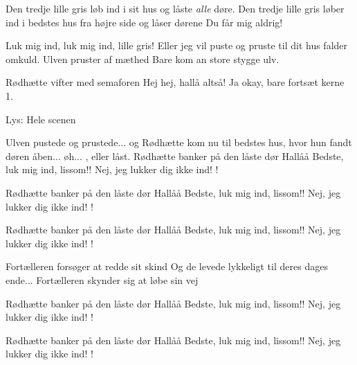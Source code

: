 \documentclass[a4paper,11pt]{article}
\begin{document}
\begin{sketch}
 Den tredje lille gris løb ind i sit hus og låste \emph{alle} døre.
\scene Den tredje lille gris løber ind i bedstes hus fra højre side og låser dørene
 Du får mig aldrig!

 Luk mig ind, luk mig ind, lille gris! Eller jeg vil  puste og pruste til dit hus falder omkuld.
\scene Ulven pruster af mæthed
 Bare kom an store stygge ulv.

\scene Rødhætte vifter med semaforen
 Hej hej, hallå altså!
 Ja okay, bare fortsæt kerne 1.

\scene Lys: Hele scenen

 Ulven pustede og prustede... og Rødhætte kom nu til bedstes hus, hvor hun fandt døren åben... øh... , eller låst.
\scene Rødhætte banker på den låste dør
 Hallåå Bedste, luk mig ind, lissom!!
 Nej, jeg lukker dig ikke ind!
  !

\scene Rødhætte banker på den låste dør
 Hallåå Bedste, luk mig ind, lissom!!
 Nej, jeg lukker dig ikke ind!
  !

\scene Rødhætte banker på den låste dør
 Hallåå Bedste, luk mig ind, lissom!!
 Nej, jeg lukker dig ikke ind!
  !

\scene Fortælleren forsøger at redde sit skind
 Og de levede lykkeligt til deres dages ende...
\scene Fortælleren skynder sig at løbe sin vej

\scene Rødhætte banker på den låste dør
 Hallåå Bedste, luk mig ind, lissom!!
 Nej, jeg lukker dig ikke ind!
  !

\scene Rødhætte banker på den låste dør
 Hallåå Bedste, luk mig ind, lissom!!
 Nej, jeg lukker dig ikke ind!
  !


\end{sketch}
\end{document}
